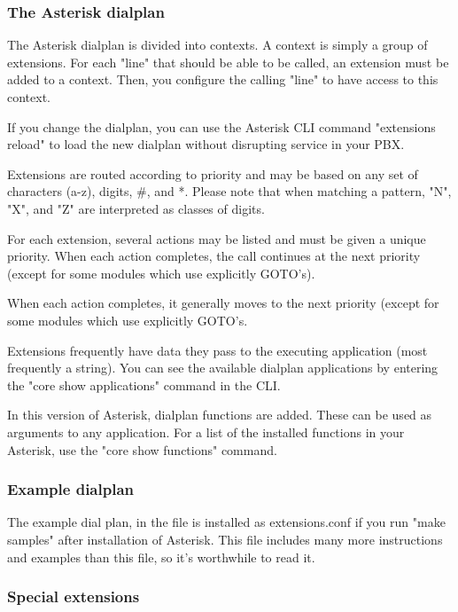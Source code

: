 \subsubsection{The Asterisk dialplan}

The Asterisk dialplan is divided into contexts. A context is simply a group
of extensions. For each "line" that should be able to be called, an extension
must be added to a context. Then, you configure the calling "line" to have
access to this context.

If you change the dialplan, you can use the Asterisk CLI command
"extensions reload" to load the new dialplan without disrupting
service in your PBX.

Extensions are routed according to priority and may be based on any set
of characters (a-z), digits, \#, and *. Please note that when matching a
pattern, "N", "X", and "Z" are interpreted as classes of digits.

For each extension, several actions may be listed and must be given a unique
priority. When each action completes, the call continues at the next priority
(except for some modules which use explicitly GOTO's).

When each action completes, it generally moves to the next priority (except for
some modules which use explicitly GOTO's.

Extensions frequently have data they pass to the executing application
(most frequently a string).  You can see the available dialplan applications
by entering the "core show applications" command in the CLI.

In this version of Asterisk, dialplan functions are added. These can
be used as arguments to any application. For a list of the installed
functions in your Asterisk, use the "core show functions" command.

\subsubsection{Example dialplan}

The example dial plan, in the  file
is installed as extensions.conf if you run "make samples" after
installation of Asterisk. This file includes many more instructions
and examples than this file, so it's worthwhile to read it.
	
\subsubsection{Special extensions}

